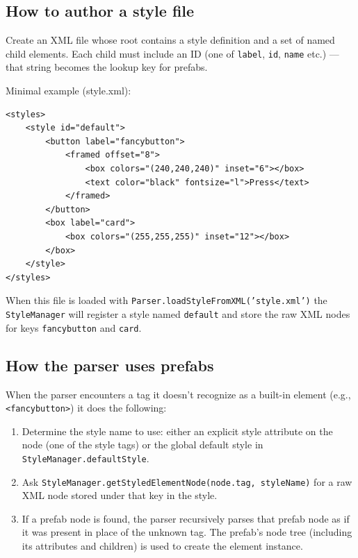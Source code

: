 \documentclass[a4paper,11pt]{article}
\begin{document}
\subsection*{How to author a style file}
Create an XML file whose root contains a style definition and a set of named child elements. Each child must include an ID (one of \texttt{label}, \texttt{id}, \texttt{name} etc.) — that string becomes the lookup key for prefabs.

Minimal example (style.xml):\\
\begin{verbatim}
<styles>
    <style id="default">
        <button label="fancybutton">
            <framed offset="8">
                <box colors="(240,240,240)" inset="6"></box>
                <text color="black" fontsize="l">Press</text>
            </framed>
        </button>
        <box label="card">
            <box colors="(255,255,255)" inset="12"></box>
        </box>
    </style>
</styles>
\end{verbatim}

When this file is loaded with \texttt{Parser.loadStyleFromXML('style.xml')} the \texttt{StyleManager} will register a style named \texttt{default} and store the raw XML nodes for keys \texttt{fancybutton} and \texttt{card}.

\subsection*{How the parser uses prefabs}
When the parser encounters a tag it doesn't recognize as a built-in element (e.g., \texttt{<fancybutton>}) it does the following:
\begin{enumerate}
    \item Determine the style name to use: either an explicit style attribute on the node (one of the style tags) or the global default style in \texttt{StyleManager.defaultStyle}.
    \item Ask \texttt{StyleManager.getStyledElementNode(node.tag, styleName)} for a raw XML node stored under that key in the style.
    \item If a prefab node is found, the parser recursively parses that prefab node as if it was present in place of the unknown tag. The prefab's node tree (including its attributes and children) is used to create the element instance.
\end{enumerate}
\end{document}
